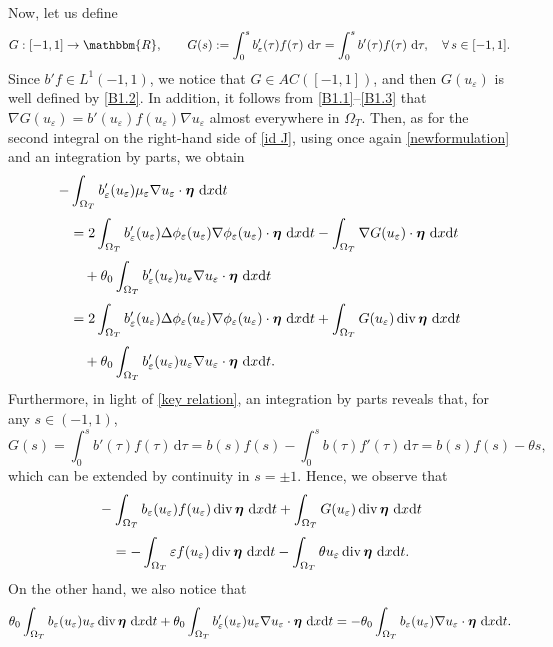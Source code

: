 \documentclass[11pt,  reqno]{amsart}%
\theoremstyle{plain}
\theoremstyle{definition}
\theoremstyle{remark}
\numberwithin{equation}{section}
\newcommand{\ve}{\varepsilon}
\def\div{\,\mathrm{div}}
\newcommand{\dx}{\textup{d}x}
\newcommand{\dt}{\textup{d}t}
\begin{document}
Now, let us define
$$
G: [-1,1] \to \mathbbm{R}, \qquad G(s):= \int_0^{s} b_\ve'(\tau)f(\tau) \ \mathrm{d}\tau= \int_0^{s} b'(\tau)f(\tau) \ \mathrm{d}\tau, \quad \forall \, s \in [-1,1].
$$
Since $b'f \in L^1(-1,1)$, we notice that $G\in AC([-1,1])$, and then $G(u_\varepsilon)$ is well defined by \eqref{B1.2}. In addition, it follows from \eqref{B1.1}--\eqref{B1.3} that $\nabla G(u_\ve)= b'(u_\ve) f(u_\ve) \nabla u_\ve$ almost everywhere in $\Omega_T$. Then,
as for the second integral on the right-hand side of \eqref{id J}, using once again \eqref{newformulation} and an integration by parts, we obtain
\begin{align}
   - &\int_{\Omega_T} b'_\ve (u_\ve)\mu_\ve\nabla u_\ve \cdot \boldsymbol{\eta}\ \dx \dt \notag\\[3pt]
    &=  2 \int_{\Omega_T} b'_\ve(u_\ve) \Delta \phi_\ve(u_\ve)\nabla \phi_\ve(u_\ve)\cdot \boldsymbol{\eta} \ \dx \dt -\int_{\Omega_T} \nabla G(u_\ve) \cdot \boldsymbol{\eta} \ \dx \dt \notag
    \\[3pt]
    &\quad + \theta_0 \int_{\Omega_T} b'_\ve(u_\ve) u_\ve \nabla u_\ve \cdot \boldsymbol{\eta} \ \dx \dt \notag \\[3pt]
    &=  2 \int_{\Omega_T} b'_\ve(u_\ve) \Delta \phi_\ve(u_\ve)\nabla \phi_\ve(u_\ve)\cdot \boldsymbol{\eta}\ \dx \dt +\int_{\Omega_T} G(u_\ve)\div \,  \boldsymbol{\eta} \ \dx \dt  \notag
\\[3pt]
    &\quad     
    + \theta_0 \int_{\Omega_T} b'_\ve(u_\ve) u_\ve \nabla u_\ve\cdot \boldsymbol{\eta} \ \dx \dt. \label{secondo}
\end{align}
Furthermore, in light of \eqref{key relation}, an integration by parts reveals that, for any $s \in (-1,1)$,
\begin{equation}
\label{CHI E G}
G(s)= \int_0^s b'(\tau)f(\tau) \, \mathrm{d}\tau
= b(s)f(s)- \int_0^s b(\tau) f'(\tau) \, \mathrm{d}\tau
=b(s)f(s)- \theta s,
\end{equation}
which can be extended by continuity in $s=\pm 1$. Hence, we observe that
\begin{align}
&- \int_{\Omega_T} b_\ve(u_\ve) f(u_\ve)\div \,   \boldsymbol{\eta}  \ \dx \dt 
+ 
\int_{\Omega_T} G(u_\ve)\div \,  \boldsymbol{\eta} \ \dx \dt
\notag
\\[3pt]
&
\quad = - \int_{\Omega_T} \varepsilon f(u_\ve)\div \,   \boldsymbol{\eta}  \ \dx \dt  - \int_{\Omega_T} \theta u_\ve \div \,  \boldsymbol{\eta}  \ \dx \dt.
\label{Cancellazione}
\end{align}
On the other hand, we also notice that
\begin{align}
\theta_0 \int_{\Omega_T} b_\ve(u_\ve) u_\ve \div \,  \boldsymbol{\eta} \ \dx \dt
+
\theta_0 \int_{\Omega_T} b'_\ve(u_\ve) u_\ve \nabla u_\ve\cdot \boldsymbol{\eta} \ \dx \dt 
= 
- \theta_0 \int_{\Omega_T} b_\ve(u_\ve) \nabla u_\ve \cdot  \boldsymbol{\eta} \ \dx \dt.
\label{Cancellazione2}
\end{align}
\end{document}
